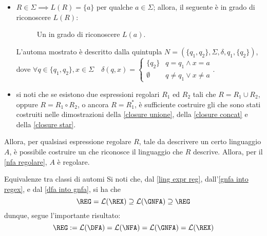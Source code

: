 \documentclass[a4paper, 12pt]{report}
\begin{document}
{\begin{itemize}
                L'automa mostrato è descritto dalla quintupla $N = (\{q_0\}, \Sigma, \delta, q_0, \{q_0\})$, dove $\forall a \in \Sigma \quad \delta(q_0, a) = \emptyset$.

            \item $R \in \Sigma \implies L(R) = \{a \}$ per qualche $a \in \Sigma$; allora, il seguente \NFA è in grado di riconoscere $L(R)$:

                \begin{figure}[H]
                    \centering
                    \caption{Un \NFA in grado di riconoscere $L(a)$.}
                \end{figure}

                L'automa mostrato è descritto dalla quintupla $N = (\{q_1, q_2\}, \Sigma, \delta, q_1, \{q_2\})$, dove $\forall q \in \{q_1, q_2\}, x \in \Sigma \quad \delta(q, x) = \left \{ \begin{array}{ll} \{q_2\} & q = q_1 \land x = a \\ \emptyset & q \neq q_1 \lor x \neq a \end{array} \right.$.

            \item si noti che se esistono due espressioni regolari $R_1$ ed $R_2$ tali che $R = R_1 \cup R_2$, oppure $R = R_1 \circ R_2$, o ancora $R = R_1^*$, è sufficiente costruire gli \NFA che sono stati costruiti nelle dimostrazioni della \cref{closure unione}, della \cref{closure concat} e della \cref{closure star}.
        \end{itemize}

        Allora, per qualsiasi espressione regolare $R$, tale da descrivere un certo linguaggio $A$, è possibile costruire un \NFA che riconosce il linguaggio che $R$ descrive. Allora, per il \cref{nfa regolare}, $A$ è regolare.
    }

    \begin{framedobs}{Equivalenze tra classi di automi}
        Si noti che, dal \cref{ling expr reg}, dall'\cref{gnfa into regex}, e dal \cref{dfa into gnfa}, si ha che $$\mathrm{\REG} = \mathcal{L}(\REX) \supseteq \mathcal{L}(\mathrm{\GNFA}) \supseteq \mathrm{\REG}$$ dunque, segue l'importante risultato: $$\mathrm{\REG} := \mathcal{L}(\mathrm{\DFA}) = \mathcal{L}(\mathrm{\NFA}) = \mathcal{L}(\mathrm{\GNFA}) = \mathcal{L}(\REX)$$
    \end{framedobs}
\end{document}

